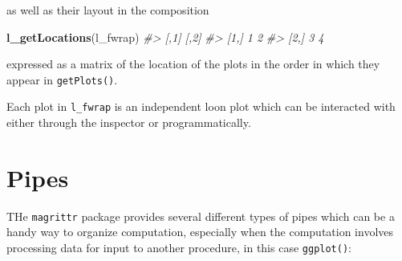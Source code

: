 \documentclass[]{article}
\newenvironment{Shaded}{\begin{snugshade}}{\end{snugshade}}
\newcommand{\KeywordTok}[1]{\textcolor[rgb]{0.13,0.29,0.53}{\textbf{#1}}}
\newcommand{\DataTypeTok}[1]{\textcolor[rgb]{0.13,0.29,0.53}{#1}}
\newcommand{\DecValTok}[1]{\textcolor[rgb]{0.00,0.00,0.81}{#1}}
\newcommand{\FloatTok}[1]{\textcolor[rgb]{0.00,0.00,0.81}{#1}}
\newcommand{\StringTok}[1]{\textcolor[rgb]{0.31,0.60,0.02}{#1}}
\newcommand{\CommentTok}[1]{\textcolor[rgb]{0.56,0.35,0.01}{\textit{#1}}}
\newcommand{\OperatorTok}[1]{\textcolor[rgb]{0.81,0.36,0.00}{\textbf{#1}}}
\newcommand{\NormalTok}[1]{#1}
\begin{document}
as well as their layout in the composition

\begin{Shaded}
\begin{Highlighting}[]
\KeywordTok{l_getLocations}\NormalTok{(l_fwrap)}
\CommentTok{#>      [,1] [,2]}
\CommentTok{#> [1,]    1    2}
\CommentTok{#> [2,]    3    4}
\end{Highlighting}
\end{Shaded}

expressed as a matrix of the location of the plots in the order in which
they appear in \texttt{getPlots()}.

Each plot in \texttt{l\_fwrap} is an independent loon plot which can be
interacted with either through the inspector or programmatically.

\section{Pipes}\label{pipes}

THe \texttt{magrittr} package provides several different types of pipes
which can be a handy way to organize computation, especially when the
computation involves processing data for input to another procedure, in
this case \texttt{ggplot()}:

\begin{Shaded}
\end{Shaded}
\end{document}
